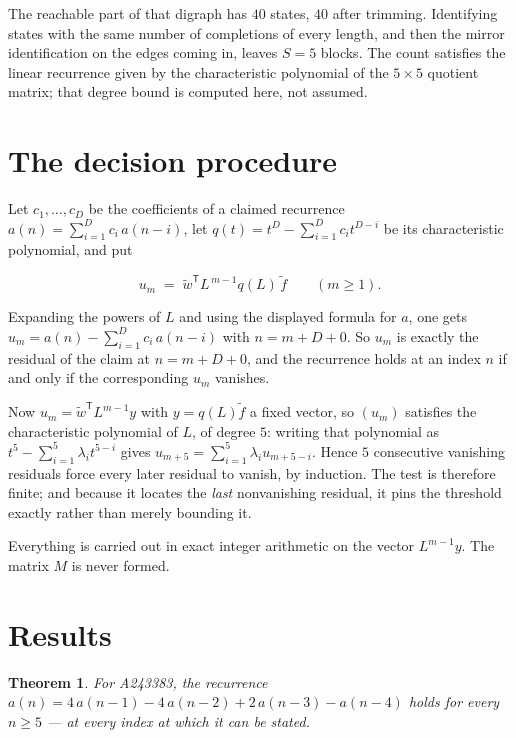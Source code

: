 \documentclass[11pt]{article}
\newtheorem{theorem}{Theorem}
\theoremstyle{definition}
\begin{document}
The reachable part of that digraph has $40$ states, $40$ after trimming. Identifying states with the same number of completions of every length, and then the mirror identification on the edges coming in, leaves $S = 5$ blocks. The count satisfies the linear recurrence given by the characteristic polynomial of the $5\times5$ quotient matrix; that degree bound is computed here, not assumed.

\section{The decision procedure}

Let $c_1,\dots,c_D$ be the coefficients of a claimed recurrence $a(n) = \sum_{i=1}^{D} c_i\,a(n-i)$, let $q(t) = t^{D} - \sum_{i=1}^{D} c_i t^{D-i}$ be its characteristic polynomial, and put

\[u_m \;=\; \tilde w^{\mathsf T} L^{\,m-1} q(L)\,\tilde f \qquad (m \ge 1).\]

Expanding the powers of $L$ and using the displayed formula for $a$, one gets $u_m = a(n) - \sum_{i=1}^{D} c_i\,a(n-i)$ with $n = m + D + 0$. So $u_m$ is exactly the residual of the claim at $n = m + D + 0$, and the recurrence holds at an index $n$ if and only if the corresponding $u_m$ vanishes.

Now $u_m = \tilde w^{\mathsf T} L^{m-1} y$ with $y = q(L)\tilde f$ a fixed vector, so $(u_m)$ satisfies the characteristic polynomial of $L$, of degree $5$: writing that polynomial as $t^{5} - \sum_{i=1}^{5} \lambda_i t^{5-i}$ gives $u_{m+5} = \sum_{i=1}^{5} \lambda_i u_{m+5-i}$. Hence $5$ consecutive vanishing residuals force every later residual to vanish, by induction. The test is therefore finite; and because it locates the {\itshape last} nonvanishing residual, it pins the threshold exactly rather than merely bounding it.

Everything is carried out in exact integer arithmetic on the vector $L^{m-1}y$. The matrix $M$ is never formed.

\section{Results}

\begin{theorem} For A243383, the recurrence $a(n) = 4\,a(n-1) - 4\,a(n-2) + 2\,a(n-3) - a(n-4)$ holds for every $n \ge 5$ --- at every index at which it can be stated.\end{theorem}
\end{document}
